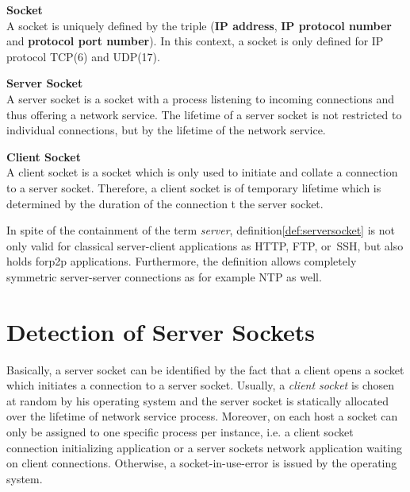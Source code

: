 \parbox{
\textwidth}{
\begin{defn}
	{\textbf{Socket}\\} A socket is uniquely defined by the triple (\textbf{IP address}, \textbf{IP protocol number} and \textbf{protocol port number}). In this context, a socket is only defined for IP protocol \gls{TCP}(6) and \gls{UDP}(17).
\end{defn}
}
\parbox{
\textwidth}{
\begin{defn}
	{\textbf{Server Socket
	\label{def:serversocket}}\\} A server socket is a socket with a process listening to incoming connections and thus offering a network service. The lifetime of a server socket is not restricted to individual connections, but by the lifetime of the network service.
\end{defn}
}

\parbox{
\textwidth}{
\begin{defn}
	{\textbf{Client Socket}\\} A client socket is a socket which is only used to initiate and collate a connection to a server socket. Therefore, a client	socket is of temporary lifetime which is determined by the duration of the 	connection t the server socket.
\end{defn}
}

In spite of the containment of the term \emph{server}, definition\ref{def:serversocket} is not only valid for classical server-client applications as \gls{HTTP}, \gls{FTP}, or \gls{SSH}, but also holds for\gls{p2p} applications. Furthermore, the definition allows completely symmetric server-server connections as for example \gls{NTP} as well.


\section{Detection of Server Sockets
\label{section:socket_detection}}

Basically, a \gls{server socket} can be identified by the fact that a client opens a socket which initiates a connection to a \gls{server socket}. Usually, a \emph{client socket} is chosen at random by his operating system and the \gls{server socket} is statically allocated over the lifetime of network service process. Moreover, on each host a socket can only be assigned to one specific process per instance, i.e. a client socket connection initializing application or a \glspl{server socket} network application waiting on client connections. Otherwise, a socket-in-use-error is issued by the operating system\citep{Schatzmann:Dissection}.

